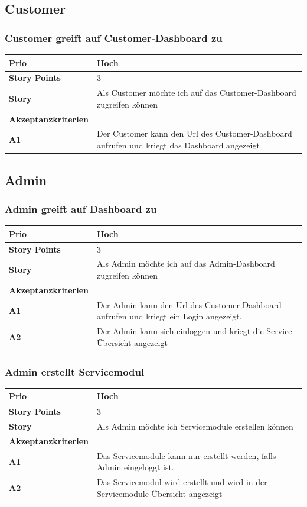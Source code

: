 \documentclass[11pt]{scrartcl}
\begin{document}
\subsection{Customer}
\subsubsection{Customer greift auf Customer-Dashboard zu}
\begin{tabularx}{\linewidth}{l X}
  \textbf{Prio} & Hoch\\
  \hline
  \textbf{Story Points} & 3\\
  \hline
  \textbf{Story}& Als Customer möchte ich auf das Customer-Dashboard zugreifen können\\
  \hline
    \textbf{Akzeptanzkriterien} & \\
    \hline
  \textbf{A1} & Der Customer kann den Url des Customer-Dashboard aufrufen und 
  kriegt das Dashboard angezeigt\\
  \hline
   \end{tabularx}
  
 \subsection{Admin}
 \subsubsection{Admin greift auf Dashboard zu}
\begin{tabularx}{\linewidth}{l X}
  \textbf{Prio} & Hoch\\
  \hline
  \textbf{Story Points} & 3\\
  \hline
  \textbf{Story}& Als Admin möchte ich auf das Admin-Dashboard zugreifen können\\
  \hline
    \textbf{Akzeptanzkriterien} & \\
    \hline
  \textbf{A1} & Der Admin kann den Url des Customer-Dashboard aufrufen und 
  kriegt ein Login angezeigt.\\
  \hline
  \textbf{A2} & Der Admin kann sich einloggen und kriegt die Service Übersicht angezeigt\\
  \hline
 \end{tabularx}
 
 
  \subsubsection{Admin erstellt Servicemodul}
\begin{tabularx}{\linewidth}{l X}
  \textbf{Prio} & Hoch\\
  \hline
  \textbf{Story Points} & 3\\
  \hline
  \textbf{Story}& Als Admin möchte ich Servicemodule erstellen können\\
  \hline
    \textbf{Akzeptanzkriterien} & \\
    \hline
  \textbf{A1} & Das Servicemodule kann nur erstellt werden, falls Admin eingeloggt ist.\\
  \hline
  \textbf{A2} & Das Servicemodul wird erstellt und wird in der Servicemodule Übersicht angezeigt\\
  \hline
 \end{tabularx}
 
\end{document}
